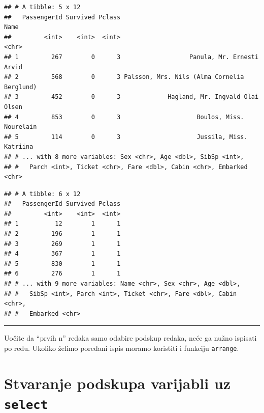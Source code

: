 \documentclass[]{book}
\newenvironment{Shaded}{\begin{snugshade}}{\end{snugshade}}
\newcommand{\KeywordTok}[1]{\textcolor[rgb]{0.13,0.29,0.53}{\textbf{#1}}}
\newcommand{\DecValTok}[1]{\textcolor[rgb]{0.00,0.00,0.81}{#1}}
\newcommand{\StringTok}[1]{\textcolor[rgb]{0.31,0.60,0.02}{#1}}
\newcommand{\CommentTok}[1]{\textcolor[rgb]{0.56,0.35,0.01}{\textit{#1}}}
\newcommand{\OperatorTok}[1]{\textcolor[rgb]{0.81,0.36,0.00}{\textbf{#1}}}
\newcommand{\NormalTok}[1]{#1}
\theoremstyle{definition}
\theoremstyle{definition}
\theoremstyle{definition}
\theoremstyle{remark}
\begin{document}
\begin{verbatim}
## # A tibble: 5 x 12
##   PassengerId Survived Pclass                                        Name
##         <int>    <int>  <int>                                       <chr>
## 1         267        0      3                   Panula, Mr. Ernesti Arvid
## 2         568        0      3 Palsson, Mrs. Nils (Alma Cornelia Berglund)
## 3         452        0      3             Hagland, Mr. Ingvald Olai Olsen
## 4         853        0      3                     Boulos, Miss. Nourelain
## 5         114        0      3                     Jussila, Miss. Katriina
## # ... with 8 more variables: Sex <chr>, Age <dbl>, SibSp <int>,
## #   Parch <int>, Ticket <chr>, Fare <dbl>, Cabin <chr>, Embarked <chr>
\end{verbatim}

\begin{Shaded}
\end{Shaded}

\begin{verbatim}
## # A tibble: 6 x 12
##   PassengerId Survived Pclass
##         <int>    <int>  <int>
## 1          12        1      1
## 2         196        1      1
## 3         269        1      1
## 4         367        1      1
## 5         830        1      1
## 6         276        1      1
## # ... with 9 more variables: Name <chr>, Sex <chr>, Age <dbl>,
## #   SibSp <int>, Parch <int>, Ticket <chr>, Fare <dbl>, Cabin <chr>,
## #   Embarked <chr>
\end{verbatim}

\begin{center}\rule{0.5\linewidth}{\linethickness}\end{center}

Uočite da ``prvih n'' redaka samo odabire podskup redaka, neće ga nužno
ispisati po redu. Ukoliko želimo poredani ispis moramo koristiti i
funkciju \texttt{arrange}.

\section{\texorpdfstring{Stvaranje podskupa varijabli uz
\texttt{select}}{Stvaranje podskupa varijabli uz select}}\label{stvaranje-podskupa-varijabli-uz-select}
\end{document}
